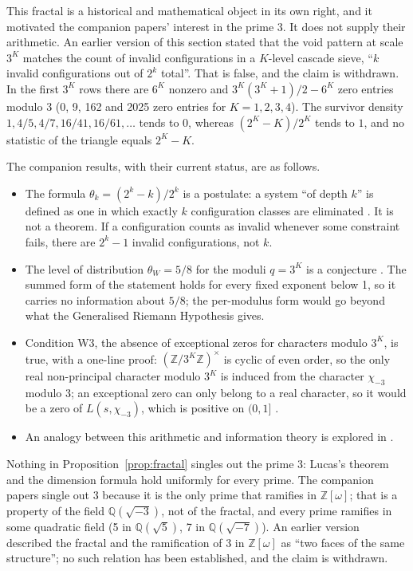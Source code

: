 \documentclass[11pt]{amsart}
\begin{document}
This fractal is a historical and mathematical object in its own right, and it motivated the companion papers' interest in the prime 3. It does not supply their arithmetic. An earlier version of this section stated that the void pattern at scale $3^K$ matches the count of invalid configurations in a $K$-level cascade sieve, ``$k$ invalid configurations out of $2^k$ total''. That is false, and the claim is withdrawn. In the first $3^K$ rows there are $6^K$ nonzero and $3^K(3^K+1)/2 - 6^K$ zero entries modulo 3 (0, 9, 162 and 2025 zero entries for $K = 1, 2, 3, 4$). The survivor density $1, 4/5, 4/7, 16/41, 16/61, \ldots$ tends to $0$, whereas $(2^K-K)/2^K$ tends to $1$, and no statistic of the triangle equals $2^K - K$.

The companion results, with their current status, are as follows.
\begin{itemize}
\item The formula $\theta_k = (2^k-k)/2^k$ is a postulate: a system ``of depth $k$'' is defined as one in which exactly $k$ configuration classes are eliminated \cite{forcing,ramanujan}. It is not a theorem. If a configuration counts as invalid whenever some constraint fails, there are $2^k - 1$ invalid configurations, not $k$.
\item The level of distribution $\theta_W = 5/8$ for the moduli $q = 3^K$ is a conjecture \cite{eisenstein}. The summed form of the statement holds for every fixed exponent below 1, so it carries no information about $5/8$; the per-modulus form would go beyond what the Generalised Riemann Hypothesis gives.
\item Condition W3, the absence of exceptional zeros for characters modulo $3^K$, is true, with a one-line proof: $(\mathbb{Z}/3^K\mathbb{Z})^\times$ is cyclic of even order, so the only real non-principal character modulo $3^K$ is induced from the character $\chi_{-3}$ modulo 3; an exceptional zero can only belong to a real character, so it would be a zero of $L(s,\chi_{-3})$, which is positive on $(0,1]$ \cite{w3condition}.
\item An analogy between this arithmetic and information theory is explored in \cite{shannon}.
\end{itemize}

Nothing in Proposition~\ref{prop:fractal} singles out the prime 3: Lucas's theorem and the dimension formula hold uniformly for every prime. The companion papers single out 3 because it is the only prime that ramifies in $\mathbb{Z}[\omega]$; that is a property of the field $\mathbb{Q}(\sqrt{-3})$, not of the fractal, and every prime ramifies in some quadratic field (5 in $\mathbb{Q}(\sqrt{5})$, 7 in $\mathbb{Q}(\sqrt{-7})$). An earlier version described the fractal and the ramification of 3 in $\mathbb{Z}[\omega]$ as ``two faces of the same structure''; no such relation has been established, and the claim is withdrawn.
\end{document}
